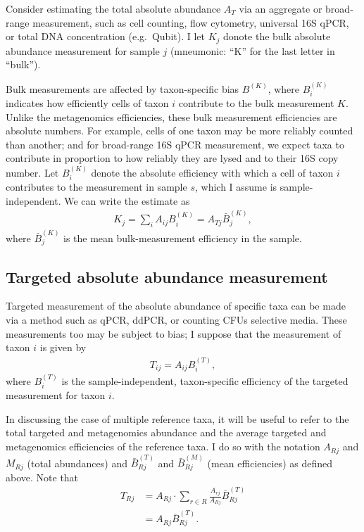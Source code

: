 \documentclass[
]{article}
\theoremstyle{definition}
\theoremstyle{definition}
\theoremstyle{definition}
\theoremstyle{definition}
\theoremstyle{remark}
\begin{document}
Consider estimating the total absolute abundance \(A_{T}\) via an aggregate or broad-range measurement, such as cell counting, flow cytometry, universal 16S qPCR, or total DNA concentration (e.g.~Qubit).
I let \(K_j\) donote the bulk absolute abundance measurement for sample \(j\) (mneumonic: ``K'' for the last letter in ``bulk'').

Bulk measurements are affected by taxon-specific bias \(B^{(K)}\), where \(B^{(K)}_i\) indicates how efficiently cells of taxon \(i\) contribute to the bulk measurement \(K\).
Unlike the metagenomics efficiencies, these bulk measurement efficiencies are absolute numbers.
For example, cells of one taxon may be more reliably counted than another; and for broad-range 16S qPCR measurement, we expect taxa to contribute in proportion to how reliably they are lysed and to their 16S copy number.
Let \(B^{(K)}_i\) denote the absolute efficiency with which a cell of taxon \(i\) contributes to the measurement in sample \(s\), which I assume is sample-independent.
We can write the estimate as
\begin{align}
  \label{eq:K}
  K_j = \sum_i A_{ij} B^{(K)}_i = A_{Tj} \bar B^{(K)}_j,
\end{align}
where \(\bar B^{(K)}_j\) is the mean bulk-measurement efficiency in the sample.

\hypertarget{targeted-absolute-abundance-measurement}{%
\subsection{Targeted absolute abundance measurement}\label{targeted-absolute-abundance-measurement}}

Targeted measurement of the absolute abundance of specific taxa can be made via a method such as qPCR, ddPCR, or counting CFUs selective media.
These measurements too may be subject to bias;
I suppose that the measurement of taxon \(i\) is given by
\begin{align}
  \label{eq:T}
  T_{ij} = A_{ij} B^{(T)}_i,
\end{align}
where \(B^{(T)}_i\) is the sample-independent, taxon-specific efficiency of the targeted measurement for taxon \(i\).

In discussing the case of multiple reference taxa, it will be useful to refer to the total targeted and metagenomics abundance and the average targeted and metagenomics efficiencies of the reference taxa.
I do so with the notation \(A_{Rj}\) and \(M_{Rj}\) (total abundances) and \(\bar B^{(T)}_{Rj}\) and \(\bar B^{(M)}_{Rj}\) (mean efficiencies) as defined above.
Note that
\begin{align}
  \label{eq:T-Rj}
  T_{Rj} 
    &= A_{Rj} \cdot \sum_{r \in R} \frac{A_{rj}}{A_{Rj}} \bar B^{(T)}_{Rj}
  \\&= A_{Rj} \bar B^{(T)}_{Rj}.
\end{align}
\end{document}

